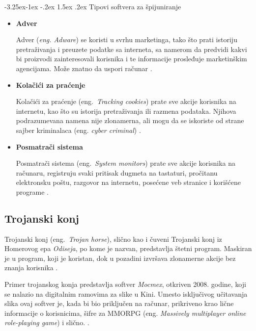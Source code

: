 \documentclass[a4paper]{article}
\makeatletter
\renewcommand\paragraph{\@startsection{paragraph}{4}{\z@}%
   {-3.25ex\@plus -1ex \@minus -.2ex}%
   {1.5ex \@plus .2ex}%
   {\normalfont\normalsize\bfseries}}
\makeatother
\begin{document}
\paragraph{Tipovi softvera za špijuniranje}
\begin{itemize}
\item \textbf{Adver}

Adver (\textit{eng. Adware}) se koristi u svrhu marketinga, tako što prati istoriju pretraživanja i preuzete podatke sa interneta, sa namerom da predvidi kakvi bi proizvodi zainteresovali korisnika i te informacije prosleđuje marketinškim agencijama. Može znatno da uspori računar \cite{spyware}.

\item \textbf{Kolačići za praćenje}

Kolačići za praćenje (eng.~{\em Tracking cookies}) prate sve akcije korisnika na internetu, kao što su istorija pretraživanja ili razmena podataka. Njihova podrazumevana namena nije zlonamerna, ali mogu da se iskoriste od strane sajber kriminalaca (eng. \textit{cyber criminal}) \cite{tracking_cookies}.

\item \textbf{Posmatrači sistema}

Posmatrači sistema (eng.~{\em System monitors}) prate sve akcije korisnika na računaru, registruju svaki pritisak dugmeta na tastaturi, pročitanu elektronsku poštu, razgovor na internetu, posećene veb stranice i korišćene programe \cite{spyware}.
    
\end{itemize}

\subsection{Trojanski konj}
\label{Odisej}

Trojanski konj (eng.~{\em Trojan horse}), slično kao i čuveni Trojanski konj iz Homerovog epa \textit{Odiseja}, po kome je nazvan, predstavlja štetni program. Maskiran je u program, koji je koristan, dok u pozadini izvršava zlonamerne akcije bez znanja korisnika \cite{trojanhorse}.

Primer trojanskog konja predstavlja softver \textit{Mocmex}, otkriven 2008. godine, koji se nalazio na digitalnim ramovima za slike u Kini. Umesto isključivog učitavanja slika ovaj softver je, kada bi bio priključen na računar, prikriveno krao lične informacije o korisnicima, šifre za MMORPG (eng. \textit{Massively multiplayer online role-playing game}) i slično. \cite{ethics}. 
\end{document}
